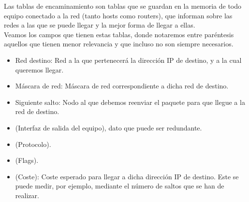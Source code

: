 Las tablas de encaminamiento son tablas que se guardan en la memoria de todo equipo conectado a la red (tanto hosts como routers), que informan sobre las redes a las que se puede llegar y la mejor forma de llegar a ellas.\\

Veamos los campos que tienen estas tablas, donde notaremos entre paréntesis aquellos que tienen menor relevancia y que incluso no son siempre necesarios.
\begin{itemize}
    \item Red destino: Red a la que pertenecerá la dirección IP de destino, y a la cual queremos llegar.
    \item Máscara de red: Máscara de red correspondiente a dicha red de destino.
    \item Siguiente salto: Nodo al que debemos reenviar el paquete para que llegue a la red de destino.
    \item (Interfaz de salida del equipo), dato que puede ser redundante. 
    \item (Protocolo).
    \item (Flags).
    \item (Coste): Coste esperado para llegar a dicha dirección IP de destino. Este se puede medir, por ejemplo, mediante el número de saltos que se han de realizar.
\end{itemize}

